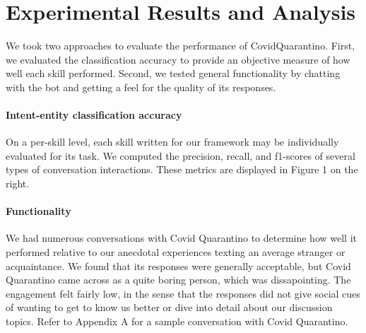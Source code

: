 \documentclass[11pt,a4paper]{article}
\begin{document}
\section{Experimental Results and Analysis}
We took two approaches to evaluate the performance of CovidQuarantino. First, we evaluated the classification accuracy to provide an objective measure of how well each skill performed. Second, we tested general functionality by chatting with the bot and getting a feel for the quality of its responses. 

\paragraph{Intent-entity classification accuracy} On a per-skill level, each skill written for our framework may be individually evaluated for its task. We computed the precision, recall, and f1-scores of several types of conversation interactions. These metrics are displayed in Figure 1 on the right.
\paragraph{Functionality} We had numerous conversations with Covid Quarantino to determine how well it performed relative to our anecdotal experiences texting an average stranger or acquaintance. We found that its responses were generally acceptable, but Covid Quarantino came across as a quite boring person, which was dissapointing. The engagement felt fairly low, in the sense that the responses did not give social cues of wanting to get to know us better or dive into detail about our discussion topics. Refer to Appendix A for a sample conversation with Covid Quarantino.
\end{document}
